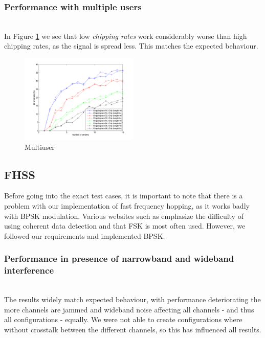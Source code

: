 		\subsubsection{Performance with multiple users}~\\
				
			In Figure \ref{fig:dsss_multiuser} we see that low \emph{chipping rates} work considerably worse than high chipping rates, as the signal is spread less.
			This matches the expected behaviour.
				
			\begin{figure}[H]
			\centering
				\includegraphics[width=0.5\textwidth]{imgs/results/plot_mode_dsss-test_numSenders-rep_20-dataRate_8-dataLength_128.png}
				\caption{Multiuser}
				\label{fig:dsss_multiuser}
			\end{figure}
	
	\subsection{FHSS}
		
		Before going into the exact test cases, it is important to note that there is a problem with our implementation of fast frequency hopping, as it works badly with BPSK modulation. Various websites such as \cite{web-nl} emphasize the difficulty of using coherent data detection and that FSK is most often used. However, we followed our requirements and implemented BPSK.
		
		\subsubsection{Performance in presence of narrowband and wideband interference}~\\
			The results widely match expected behaviour, with performance deteriorating the more channels are jammed and wideband noise affecting all channels - and thus all configurations - equally.
			We were not able to create configurations where without crosstalk between the different channels, so this has influenced all results.
			
